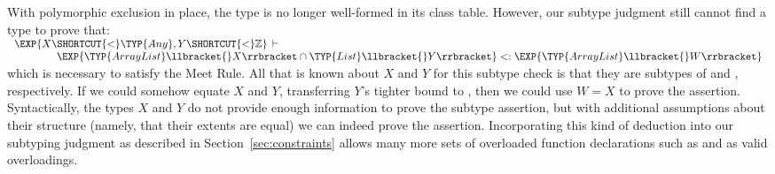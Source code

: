 With polymorphic exclusion in place, 
the type  is no longer well-formed in its class table.
However, our subtype judgment still cannot find a type  to prove that:
\\[.5em]
\hspace*{.5em}
\ensuremath{
\begin{array}{l}
{\EXP{X \SHORTCUT{<} \TYP{Any}, Y \SHORTCUT{<} \mathbb{Z}}}\,\vdash
\\
\quad\quad\quad\quad
{\EXP{\TYP{ArrayList}\llbracket{}X\rrbracket \cap \TYP{List}\llbracket{}Y\rrbracket}}\;{\subtypeof}\;{\EXP{\TYP{ArrayList}\llbracket{}W\rrbracket}}
\end{array}
}
\\[.5em]
which is necessary to satisfy the Meet Rule.
All that is known about $X$ and $Y$ for this subtype check is that
they are subtypes of  and , respectively.
If we could somehow equate $X$ and $Y$, transferring $Y$'s tighter
bound  to , then we could use $W = X$ to prove the assertion.
Syntactically, the types $X$ and $Y$ do not provide enough information
to prove the subtype assertion, but with additional assumptions about
their structure (namely, that their extents are equal) we can indeed
prove the assertion.  Incorporating this kind of deduction into our
subtyping judgment as described in Section~\ref{sec:constraints}
allows many more sets of overloaded function declarations
such as  and  as valid overloadings.



